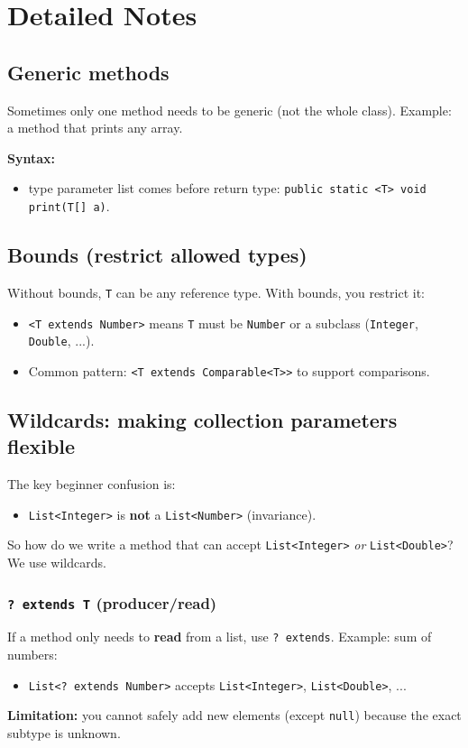 \documentclass[11pt]{article}
\begin{document}
\section{Detailed Notes}
\subsection{Generic methods}
Sometimes only one method needs to be generic (not the whole class).
Example: a method that prints any array.

\textbf{Syntax:}
\begin{itemize}
  \item type parameter list comes before return type: \texttt{public static <T> void print(T[] a)}.
\end{itemize}

\subsection{Bounds (restrict allowed types)}
Without bounds, \texttt{T} can be any reference type.
With bounds, you restrict it:
\begin{itemize}
  \item \texttt{<T extends Number>} means \texttt{T} must be \texttt{Number} or a subclass (\texttt{Integer}, \texttt{Double}, ...).
  \item Common pattern: \texttt{<T extends Comparable<T>>} to support comparisons.
\end{itemize}

\subsection{Wildcards: making collection parameters flexible}
The key beginner confusion is:
\begin{itemize}
  \item \texttt{List<Integer>} is \textbf{not} a \texttt{List<Number>} (invariance).
\end{itemize}
So how do we write a method that can accept \texttt{List<Integer>} \emph{or} \texttt{List<Double>}?
We use wildcards.

\subsubsection{\texttt{? extends T} (producer/read)}
If a method only needs to \textbf{read} from a list, use \texttt{? extends}.
Example: sum of numbers:
\begin{itemize}
  \item \texttt{List<? extends Number>} accepts \texttt{List<Integer>}, \texttt{List<Double>}, ...
\end{itemize}
\textbf{Limitation:} you cannot safely add new elements (except \texttt{null}) because the exact subtype is unknown.
\end{document}
